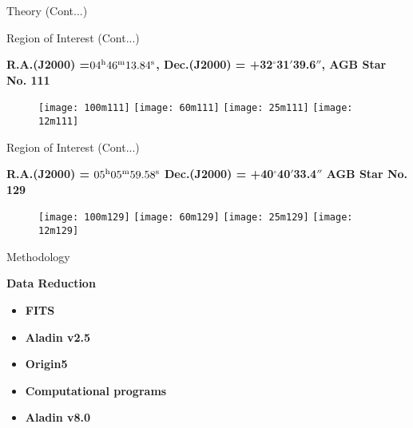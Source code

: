 \documentclass[12pt,a4paper]{beamer}
\begin{document}
\begin{frame}{Theory (Cont...)}
\begin{frame}{Region of Interest (Cont...)}
\begin{block}{\centering\textbf{ R.A.(J2000) =$04^{\rm h}46^{\rm m}13.84^{\rm s}$,
Dec.(J2000) = +32$^{\circ}$31${'}$39.6${''}$,  AGB Star No. 111 \cite{34,35} \vspace*{.5cm}}}
\begin{itemize}
\begin{figure}[h]
\vspace{0.0cm} \centering
\texttt{[image: 100m111]}
\texttt{[image: 60m111]}
\texttt{[image: 25m111]}
\texttt{[image: 12m111]}
\end{figure}
\end{itemize}
\end{block}
\end{frame}


\begin{frame}{Region of Interest (Cont...)}
\begin{block}{\centering\textbf{ R.A.(J2000) =  $05^{\rm
h}05^{\rm m} 59.58^{\rm s}$  Dec.(J2000) = +40$^{\circ}$40${'}$33.4${''}$ AGB Star No. 129 \cite{34,35}\vspace*{.5cm}}}
\begin{itemize}
\begin{figure}[h]
\vspace{0.0cm} \centering
\texttt{[image: 100m129]}
\texttt{[image: 60m129]}
\texttt{[image: 25m129]}
\texttt{[image: 12m129]}
\end{figure}
\end{itemize}
\end{block}
\end{frame}

\begin{frame}
\begin{center}
\Large\bf\color{red}{Methodology}
\end{center}
\end{frame}

\begin{frame}{Methodology}
\begin{block}{\centering\textbf{Data Reduction\\ \vspace*{.5cm}}}
\begin{itemize}
\item \textbf{FITS}
\item \textbf{Aladin v2.5}
\item \textbf{Origin5}
\item \textbf{Computational programs}
\item \textbf{Aladin v8.0}
\end{itemize}
\end{block}
\end{frame}



\end{frame}
\end{document}
